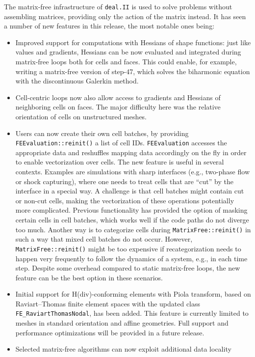 \documentclass{ansarticle-preprint}
\newcommand{\specialword}[1]{\texttt{#1}}
\newcommand{\dealii}{{\specialword{deal.II}}\xspace}
\begin{document}
The matrix-free infrastructure of \dealii{} is used to solve problems
without assembling matrices, providing only the action of the matrix
instead. It has seen a number of new features in this release, the most
notable ones being:
\begin{itemize}
\item Improved support for computations with Hessians of shape functions: just like values and gradients, Hessians can be
now evaluated and integrated during matrix-free loops
both for cells and faces. This could enable, for example, writing
a matrix-free version of step-47, which solves the biharmonic equation with the discontinuous Galerkin method.
\item Cell-centric loops now also allow access to gradients and Hessians
of neighboring cells on faces. The major difficulty here was the relative orientation
of cells on unstructured meshes.
\item Users can now create their own cell batches, by providing \texttt{FEEvaluation::reinit()} a list of cell IDs. \texttt{FEEvaluation}
accesses the appropriate data and reshuffles mapping data accordingly on
the fly in order to enable vectorization over cells. The new feature is useful in several
contexts. Examples are simulations with sharp interfaces (e.g., two-phase flow
or shock capturing), where one needs to treat cells that are ``cut'' by
the interface in a special way. A challenge is that cell batches
might contain cut or non-cut cells, making the vectorization of these operations potentially more complicated. Previous functionality has provided the option of masking certain cells in cell batches, which works well if
the code paths do not diverge too much. Another way is to
categorize cells during \texttt{MatrixFree::reinit()} in such a way that mixed cell batches do not occur. However, \texttt{MatrixFree::reinit()}
might be too expensive if recategorization needs to happen very frequently to follow the dynamics of a system, e.g., in each time step. Despite some overhead compared to static matrix-free loops, the new feature can be the best option in these scenarios.
\item Initial support for H(div)-conforming elements with Piola transform, based on Raviart--Thomas finite element spaces with the updated class \texttt{FE\_RaviartThomasNodal}, has been added. This feature is currently limited to meshes in standard orientation and affine geometries. Full support and performance optimizations will be provided in a future release.
\item Selected matrix-free algorithms can now exploit additional data locality

\end{itemize}
\end{document}
